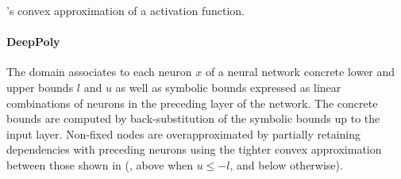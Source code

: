 \begin{marginfigure}
  \caption{\deeppoly's convex approximation of a \relu{} activation function.}
\end{marginfigure}




\paragraph{DeepPoly}

The \deeppoly{} domain  associates to each neuron $x$ of a neural network concrete lower and upper bounds $l$ and $u$ as well as symbolic bounds expressed as linear combinations of neurons in the preceding layer of the network.
%
The concrete bounds are computed by back-substitution of the symbolic bounds up to the input layer. Non-fixed \relu{} nodes are overapproximated by partially retaining dependencies with preceding neurons using the tighter convex approximation between those shown in  (\ie, above when $u \le -l$, and below otherwise).

